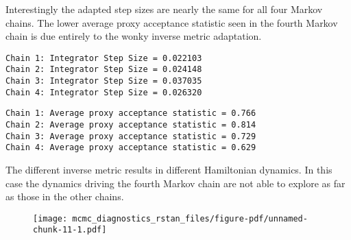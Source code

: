 \documentclass[
  letterpaper,
  DIV=11,
  numbers=noendperiod]{scrartcl}
\newenvironment{Shaded}{\begin{snugshade}}{\end{snugshade}}
\newcommand{\FunctionTok}[1]{\textcolor[rgb]{0.28,0.35,0.67}{#1}}
\newcommand{\NormalTok}[1]{\textcolor[rgb]{0.00,0.23,0.31}{#1}}
\newcommand{\SpecialCharTok}[1]{\textcolor[rgb]{0.37,0.37,0.37}{#1}}
\begin{document}
Interestingly the adapted step sizes are nearly the same for all four
Markov chains. The lower average proxy acceptance statistic seen in the
fourth Markov chain is due entirely to the wonky inverse metric
adaptation.

\begin{Shaded}
\end{Shaded}

\begin{verbatim}
Chain 1: Integrator Step Size = 0.022103
Chain 2: Integrator Step Size = 0.024148
Chain 3: Integrator Step Size = 0.037035
Chain 4: Integrator Step Size = 0.026320
\end{verbatim}

\begin{Shaded}
\end{Shaded}

\begin{verbatim}
Chain 1: Average proxy acceptance statistic = 0.766
Chain 2: Average proxy acceptance statistic = 0.814
Chain 3: Average proxy acceptance statistic = 0.729
Chain 4: Average proxy acceptance statistic = 0.629
\end{verbatim}

The different inverse metric results in different Hamiltonian dynamics.
In this case the dynamics driving the fourth Markov chain are not able
to explore as far as those in the other chains.

\begin{Shaded}
\end{Shaded}

\begin{figure}[H]

{\centering \texttt{[image: mcmc\_diagnostics\_rstan\_files/figure-pdf/unnamed-chunk-11-1.pdf]}

}

\end{figure}
\end{document}
